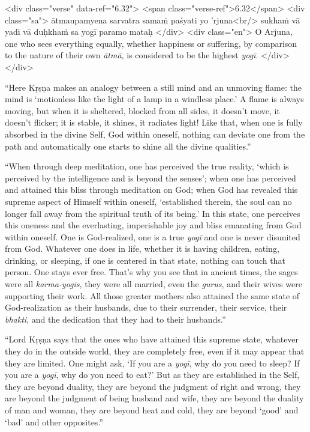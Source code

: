 \begin{html}
<div class="verse" data-ref="6.32">
  <span class="verse-ref">6.32</span>
  <div class="sa">
    ātmaupamyena sarvatra samaṁ paśyati yo ’rjuna<br/>
    sukhaṁ vā yadi vā duḥkhaṁ sa yogī paramo mataḥ
  </div>
  <div class="en">
    O Arjuna, one who sees everything equally, whether happiness or suffering, by comparison to the nature of their own \textit{ātmā}, is considered to be the highest \textit{yogī}.
  </div>
</div>
\end{html}


\enquote{Here Kṛṣṇa makes an analogy between a still mind and an unmoving flame: the mind is \enquote{motionless like the light of a lamp in a windless place.} A flame is always moving, but when it is sheltered, blocked from all sides, it doesn’t move, it doesn’t flicker; it is stable, it shines, it radiates light! Like that, when one is fully absorbed in the divine Self, God within oneself, nothing can deviate one from the path and automatically one starts to shine all the divine qualities.}

\enquote{When through deep meditation, one has perceived the true reality, \enquote{which is perceived by the intelligence and is beyond the senses}; when one has perceived and attained this bliss through meditation on God; when God has revealed this supreme aspect of Himself within oneself, \enquote{established therein, the soul can no longer fall away from the spiritual truth of its being.} In this state, one perceives this oneness and the everlasting, imperishable joy and bliss emanating from God within oneself. One is God-realized, one is a true \textit{yogī} and one is never disunited from God. Whatever one does in life, whether it is having children, eating, drinking, or sleeping, if one is centered in that state, nothing can touch that person. One stays ever free. That’s why you see that in ancient times, the sages were all \textit{karma-yogīs}, they were all married, even the \textit{gurus}, and their wives were supporting their work. All those greater mothers also attained the same state of God-realization as their husbands, due to their surrender, their service, their \textit{bhakti}, and the dedication that they had to their husbands.}

\enquote{Lord Kṛṣṇa says that the ones who have attained this supreme state, whatever they do in the outside world, they are completely free, even if it may appear that they are limited. One might ask, \enquote{If you are a \textit{yogī}, why do you need to sleep? If you are a \textit{yogī}, why do you need to eat?} But as they are established in the Self, they are beyond duality, they are beyond the judgment of right and wrong, they are beyond the judgment of being husband and wife, they are beyond the duality of man and woman, they are beyond heat and cold, they are beyond \enquote{good} and \enquote{bad} and other opposites.}

